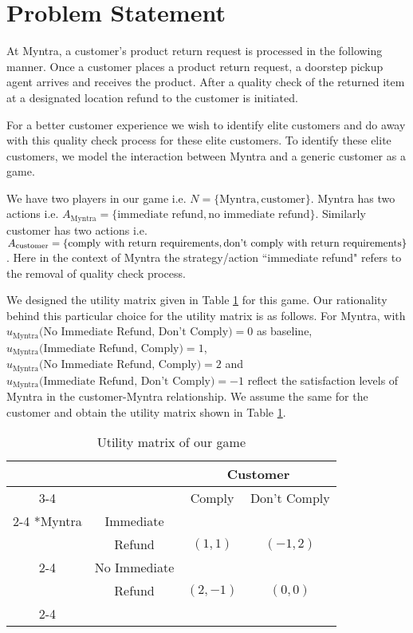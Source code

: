 \section{Problem Statement}
At Myntra, a customer's product return request is processed in the following manner. Once a customer places a product return request, a doorstep pickup agent arrives and receives the product. After a quality check of the returned item at a designated location refund to the customer is initiated.

For a better customer experience we wish to identify elite customers and do away with this quality check process for these elite customers. To identify these elite customers, we model the interaction between Myntra and a generic customer as a game.

We have two players in our game i.e. $N=\{ \text{Myntra}, \text{customer}\}$. Myntra has two actions i.e. $A_{\text{Myntra}}=\{\text{immediate refund},\text{no immediate refund}\}$. Similarly customer has two actions i.e. $A_{\text{customer}}=\{\text{comply with return requirements}, \\ \text{don't comply with return requirements}\}$.
Here in the context of Myntra the strategy/action ``immediate refund" refers to the removal of quality check process.

We designed the utility matrix  given in Table \ref{utility_matrix} for this game.
Our rationality behind this particular choice for the utility matrix is as follows. For Myntra, with $u_{\text{Myntra}}\text{(No Immediate Refund, Don't Comply)}=0$ as baseline, $u_{\text{Myntra}}\text{(Immediate Refund, Comply)}=1$, 
$u_{\text{Myntra}}\text{(No Immediate Refund, Comply)}=2$ and $u_{\text{Myntra}}\text{(Immediate Refund, Don't Comply)}=-1$ reflect the satisfaction levels of Myntra in the customer-Myntra relationship. We assume the same for the customer and obtain the utility matrix shown in Table \ref{utility_matrix}.
  \begin{table}
    \setlength{\extrarowheight}{2pt}
    \begin{tabular}{*{4}{c|}}
      \multicolumn{2}{c}{} & \multicolumn{2}{c}{Customer}\\\cline{3-4}
      \multicolumn{1}{c}{} &  & Comply  & Don't Comply \\\cline{2-4}
      \multirow{2}*{Myntra}  & Immediate &    &  \\
      & Refund & $(1,1)$ & $(-1,2)$ \\\cline{2-4}
      & No Immediate &      &  \\
      & Refund & $(2,-1)$ & $(0,0)$ \\\cline{2-4}
    \end{tabular}
     \caption{Utility matrix of our game}
      \label{utility_matrix}
  \end{table}
 \vspace*{-\baselineskip}
